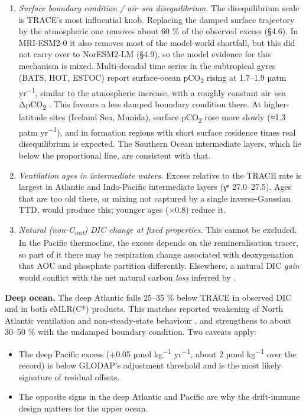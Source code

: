 \documentclass[11pt]{article}
\providecommand{\tightlist}{\setlength{\itemsep}{0pt}\setlength{\parskip}{0pt}}
\begin{document}
\begin{enumerate}
\def\labelenumi{\arabic{enumi}.}
\tightlist
\item
  \emph{Surface boundary condition / air--sea disequilibrium.} The
  disequilibrium scale is TRACE's most influential knob. Replacing the
  damped surface trajectory by the atmospheric one removes about 60 \%
  of the observed excess (§4.6). In MRI-ESM2-0 it also removes most of
  the model-world shortfall, but this did not carry over to NorESM2-LM
  (§4.9), so the model evidence for this mechanism is mixed.
  Multi-decadal time series in the subtropical gyres (BATS, HOT, ESTOC)
  report surface-ocean pCO\textsubscript{2} rising at 1.7--1.9 µatm
  yr\textsuperscript{−1}, similar to the atmospheric increase, with a
  roughly constant air--sea ΔpCO\textsubscript{2} \citep[Table
  2]{Bates2014}. This favours a less damped boundary condition there. At
  higher-latitude sites (Iceland Sea, Munida), surface
  pCO\textsubscript{2} rose more slowly (≈1.3 µatm
  yr\textsuperscript{−1}), and in formation regions with short surface
  residence times real disequilibrium is expected. The Southern Ocean
  intermediate layers, which lie below the proportional line, are
  consistent with that.
\item
  \emph{Ventilation ages in intermediate waters.} Excess relative to the
  TRACE rate is largest in Atlantic and Indo-Pacific intermediate layers
  (γⁿ 27.0--27.5). Ages that are too old there, or mixing not captured
  by a single inverse-Gaussian TTD, would produce this; younger ages
  (×0.8) reduce it.
\item
  \emph{Natural (non-C\textsubscript{ant}) DIC change at fixed
  properties.} This cannot be excluded. In the Pacific thermocline, the
  excess depends on the remineralisation tracer, so part of it there may
  be respiration change associated with deoxygenation that AOU and
  phosphate partition differently. Elsewhere, a natural DIC \emph{gain}
  would conflict with the net natural carbon \emph{loss} inferred by
  \citet{Mueller2023}.
\end{enumerate}

\textbf{Deep ocean.} The deep Atlantic falls 25--35 \% below TRACE in
observed DIC and in both eMLR(C*) products. This matches reported
weakening of North Atlantic ventilation and non-steady-state behaviour
\citep{Gruber2019, Steinfeldt2024}, and strengthens to about 30--50 \%
with the undamped boundary condition. Two caveats apply:

\begin{itemize}
\tightlist
\item
  The deep Pacific excess (+0.05 µmol kg\textsuperscript{−1}
  yr\textsuperscript{−1}, about 2 µmol kg\textsuperscript{−1} over the
  record) is below GLODAP's adjustment threshold and is the most likely
  signature of residual offsets.
\item
  The opposite signs in the deep Atlantic and Pacific are why the
  drift-immune design matters for the upper ocean.
\end{itemize}
\end{document}
